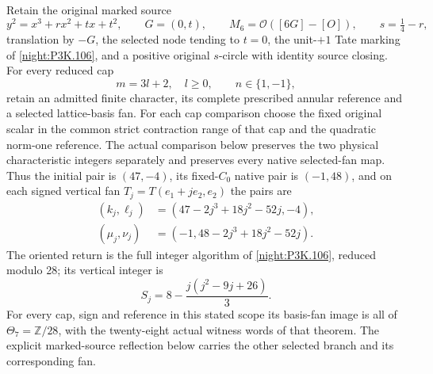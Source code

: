 \begin{theorem}\label{night:P3K.108}\label{iv:i3_all_reduced_caps}
Retain the original marked source
\[
 y^2=x^3+rx^2+tx+t^2,\qquad G=(0,t),\qquad
 M_6=\mathcal O([6G]-[O]),\qquad s=\tfrac14-r,
\]
translation by \(-G\), the selected node tending to \(t=0\),
the unit-\(+1\) Tate marking of \cref{night:P3K.106}, and a
positive original \(s\)-circle with identity source closing.
For every reduced cap
\[
 m=3l+2,\quad l\geq0,\qquad n\in\{1,-1\},
\]
retain an admitted finite character, its complete prescribed
annular reference and a selected lattice-basis fan. For each cap
comparison choose the fixed original scalar in the common strict
contraction range of that cap and the quadratic norm-one reference.
The actual comparison below preserves the two physical
characteristic integers separately and preserves every native
selected-fan map. Thus the initial pair is \((47,-4)\), its
fixed-\(C_0\) native pair is \((-1,48)\), and on each signed
vertical fan \(T_j=T(e_1+je_2,e_2)\) the pairs are
\[
 \begin{aligned}
 (k_j,\ell_j)&=(47-2j^3+18j^2-52j,-4),\\
 (\mu_j,\nu_j)&=(-1,48-2j^3+18j^2-52j).
 \end{aligned}
\]
The oriented return is the full integer algorithm of
\cref{night:P3K.106}, reduced modulo 28; its vertical integer is
\[
 S_j=8-\frac{j(j^2-9j+26)}3.
\]
For every cap, sign and
reference in this stated scope its basis-fan image is all of
\(\Theta_7=\mathbb Z/28\), with the twenty-eight actual witness
words of that theorem. The explicit marked-source reflection below
carries the other selected branch and its corresponding fan.
\end{theorem}
